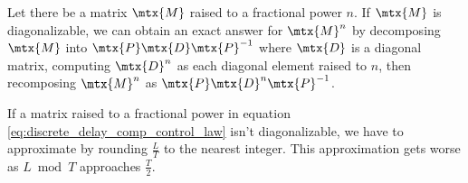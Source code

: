 Let there be a matrix $\mtx{M}$ raised to a fractional power $n$. If $\mtx{M}$
is diagonalizable, we can obtain an exact answer for $\mtx{M}^n$ by decomposing
$\mtx{M}$ into $\mtx{P}\mtx{D}\mtx{P}^{-1}$ where $\mtx{D}$ is a diagonal
matrix, computing $\mtx{D}^n$ as each diagonal element raised to $n$, then
recomposing $\mtx{M}^n$ as $\mtx{P}\mtx{D}^n\mtx{P}^{-1}$.

If a matrix raised to a fractional power in equation
\eqref{eq:discrete_delay_comp_control_law} isn't diagonalizable, we have to
approximate by rounding $\frac{L}{T}$ to the nearest integer. This approximation
gets worse as $L \bmod T$ approaches $\frac{T}{2}$.
